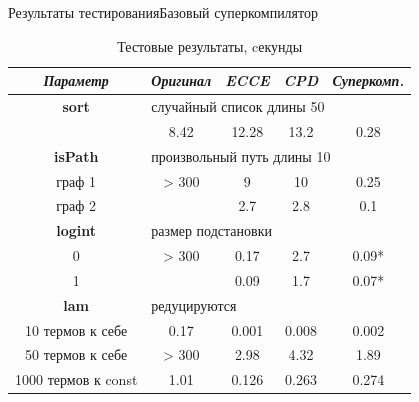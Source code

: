 \documentclass[xcolor=table]{beamer}
\begin{document}
\begin{frame}{Результаты тестирования}{\small Базовый суперкомпилятор}

\begin{table}
\center
\begin{tabular}{|c|c|c|c|c|}
\hline
{\it Параметр} & {\it Оригинал} & {\it ECCE }  & {\it CPD} & {\it\bf Суперкомп.} \\ \hline

\rowcolor{black!10}
{\bf sort} & \multicolumn{4}{|l|}{случайный список длины 50 } \\ \hline
         & 8.42     & 12.28 & 13.2 & 0.28    \\ \hline

\rowcolor{black!10}
{\bf isPath} & \multicolumn{4}{|l|}{произвольный путь длины 10} \\ \hline
граф 1 & > 300    & 9     & 10   & 0.25   \\ 
граф 2 &          & 2.7   & 2.8  & 0.1    \\
\hline

\rowcolor{black!10}
{\bf logint} & \multicolumn{4}{|l|}{размер подстановки} \\ \hline
0 & > 300    & 0.17  & 2.7  & 0.09*    \\
1 &          & 0.09  & 1.7  & 0.07*    \\
\hline

\rowcolor{black!10}
{\bf lam} & \multicolumn{4}{|l|}{редуцируются} \\ \hline
10 термов к себе    & 0.17     & 0.001 & 0.008 & 0.002  \\
50 термов к себе    & > 300    & 2.98  & 4.32  & 1.89   \\
1000 термов к const & 1.01     & 0.126 & 0.263 & 0.274  \\
\hline
\end{tabular}
\caption{Тестовые результаты, cекунды}
\end{table}

\end{frame}
\end{document}
